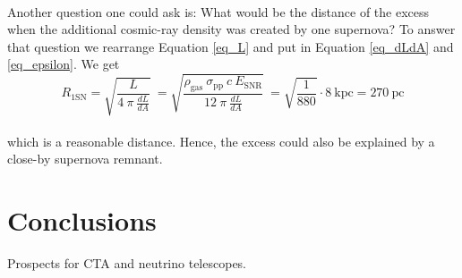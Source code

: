 \documentclass[a4paper]{article}
\begin{document}
\\
Another question one could ask is: What would be the distance of the excess when the additional cosmic-ray density was created by one supernova? To answer that question we rearrange Equation \ref{eq_L} and put in Equation \ref{eq_dLdA} and \ref{eq_epsilon}. We get
\begin{equation}
R_\text{1SN} = \sqrt{\frac{L}{4\ \pi\ \frac{dL}{dA}}}\ = \sqrt{\frac{\rho_\text{gas}\ \sigma_\text{pp}\ c\ E_\text{SNR}}{12\ \pi\ \frac{dL}{dA}}}\ = \sqrt{\frac{1}{880}}\cdot 8\ \text{kpc} = 270\ \text{pc}
\end{equation}\\
which is a reasonable distance. Hence, the excess could also be explained by a close-by supernova remnant.








\section{Conclusions}
Prospects for CTA and neutrino telescopes.
\end{document}
